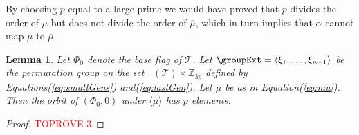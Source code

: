 \documentclass[final]{amsart}
\theoremstyle{plain}
\newtheorem{lem}[thm]{Lemma}
\theoremstyle{definition}
\theoremstyle{remark}
\numberwithin{equation}{section}
\renewcommand{\{}{\lbrace}
\renewcommand{\}}{\rbrace}
\renewcommand{\bar}{\overline}
\newcommand{\bZ}{\mathbb{Z}}
\newcommand{\cT}{\mathcal{T}}
\DeclareMathOperator{\Fw}{\mathcal{F}^{w}}
\newcommand{\mub}{\bar{\mu}}
\newcommand{\te}{\xi}
\begin{document}
By choosing $p$ equal to a large prime we would have proved that $p$ divides the order of $\mu$ but does not divide the order of $\mub$, which in turn implies that $\alpha$ cannot map $\mu$ to $\mub$.


\begin{lem}\label{lem:orbitMu}
 Let $\Phi_{0}$ denote the base flag of $\cT$. Let $\groupExt = \left\langle \te_{1}, \dots, \te_{n+1} \right\rangle $ be the permutation group on the set $\Fw(\cT) \times \bZ_{3p}$ defined by Equations\nobreakspace \textup {(\ref {eq:smallGens})} and\nobreakspace  \textup {(\ref {eq:lastGen})}.
 Let $\mu$ be as in Equation\nobreakspace \textup {(\ref {eq:mu})}.
 Then the orbit of $(\Phi_{0}, 0)$ under $\langle \mu \rangle$ has $p$ elements.
\end{lem}
\begin{proof}\textcolor{red}{TOPROVE 3}\end{proof}
\end{document}
